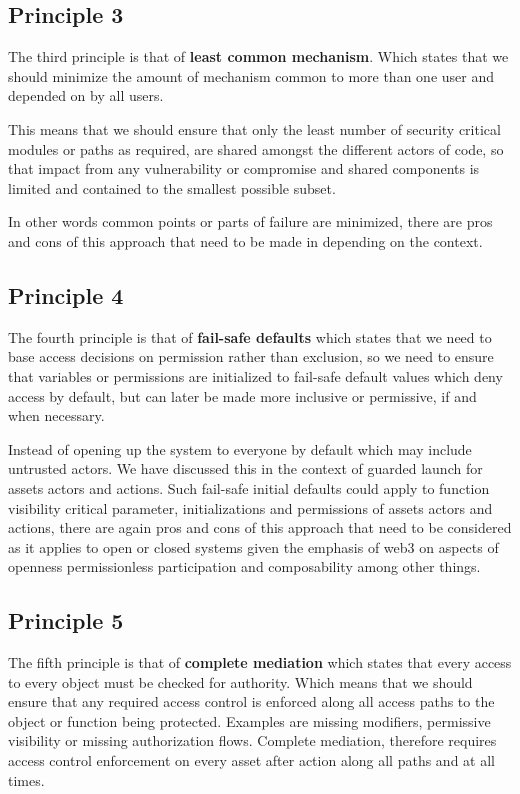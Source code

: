 \subsection{Principle 3}\label{principle-3}

The third principle is that of \textbf{least common mechanism}. Which
states that we should minimize the amount of mechanism common to more
than one user and depended on by all users.

This means that we should ensure that only the least number of security
critical modules or paths as required, are shared amongst the different
actors of code, so that impact from any vulnerability or compromise and
shared components is limited and contained to the smallest possible
subset.

In other words common points or parts of failure are minimized, there
are pros and cons of this approach that need to be made in depending on
the context.

\subsection{Principle 4}\label{principle-4}

The fourth principle is that of \textbf{fail-safe defaults} which states
that we need to base access decisions on permission rather than
exclusion, so we need to ensure that variables or permissions are
initialized to fail-safe default values which deny access by default,
but can later be made more inclusive or permissive, if and when
necessary.

Instead of opening up the system to everyone by default which may
include untrusted actors. We have discussed this in the context of
guarded launch for assets actors and actions. Such fail-safe initial
defaults could apply to function visibility critical parameter,
initializations and permissions of assets actors and actions, there are
again pros and cons of this approach that need to be considered as it
applies to open or closed systems given the emphasis of web3 on aspects
of openness permissionless participation and composability among other
things.

\subsection{Principle 5}\label{principle-5}

The fifth principle is that of \textbf{complete mediation} which states
that every access to every object must be checked for authority. Which
means that we should ensure that any required access control is enforced
along all access paths to the object or function being protected.
Examples are missing modifiers, permissive visibility or missing
authorization flows. Complete mediation, therefore requires access
control enforcement on every asset after action along all paths and at
all times.

